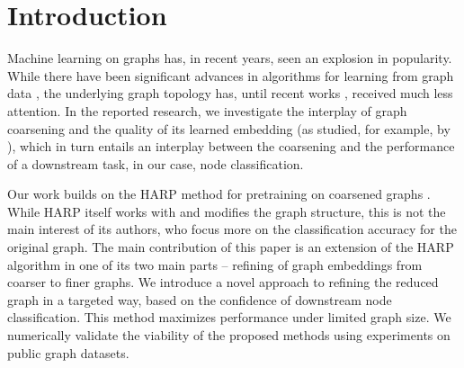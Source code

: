 \section{Introduction}
Machine learning on graphs has, in recent years, seen an explosion in popularity. While there have been significant advances in algorithms for learning from graph data \cite{defferrard_convolutional_2016,kipf_semi-supervised_2017}, the underlying graph topology has, until recent works \cite{topping_understanding_2021,velickovic_geometric_2021}, received much less attention. In the reported research, we investigate the interplay of graph coarsening and the quality of its learned embedding (as studied, for example, by \cite{akyildiz_understanding_2020,makarov_survey_2021}), which in turn entails an interplay between the coarsening and the performance of a downstream task, in our case, node classification.

Our work builds on the HARP method for pretraining on coarsened graphs \cite{chen_harp_2018}. While HARP itself works with and modifies the graph structure, this is not the main interest of its authors, who focus more on the classification accuracy for the original graph. The main contribution of this paper is an extension of the HARP algorithm in one of its two main parts -- refining of graph embeddings from coarser to finer graphs. We introduce a novel approach to refining the reduced graph in a targeted way, based on the confidence of downstream node classification. This method maximizes performance under limited graph size. We numerically validate the viability of the proposed methods using experiments on public graph datasets.
